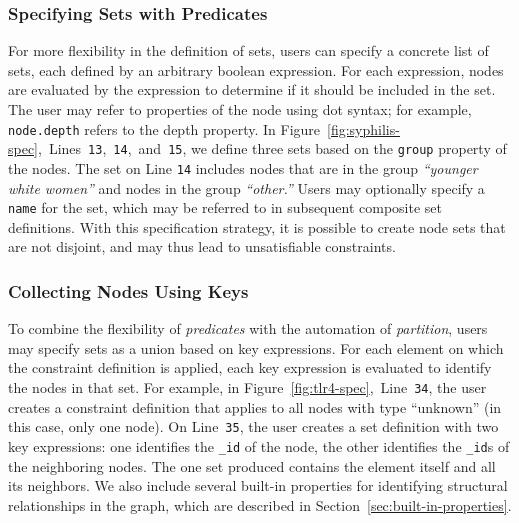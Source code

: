 \subsubsection{Specifying Sets with Predicates}
For more flexibility in the definition of sets, users
can specify a concrete list of sets, each defined by an arbitrary boolean
expression. For each expression, nodes are evaluated by the expression
to determine if it should be included in the set. The user may
refer to properties of the node using dot syntax; for example,
\texttt{node.depth} refers to the depth property. In 
Figure~\ref{fig:syphilis-spec},~Lines~\texttt{13},~\texttt{14},~and~\texttt{15},
we define three sets based on the \texttt{group} property of the nodes.
The set on Line \texttt{14} includes nodes that are in the group 
\emph{``younger white women''} and nodes in the group \emph{``other.''}
Users may optionally specify a \texttt{name} for the set, which may be 
referred to in subsequent composite set definitions. With this specification 
strategy, it is possible to create node sets that are not disjoint, 
and may thus lead to unsatisfiable constraints.

\subsubsection{Collecting Nodes Using Keys}
To combine the flexibility of \emph{predicates} with the automation of 
\emph{partition}, users may specify sets as a union based on key expressions.
For each element on which the constraint definition is applied, each key expression is
evaluated to identify the nodes in that set.
For example, in Figure~\ref{fig:tlr4-spec},~Line~\texttt{34}, the 
user creates a constraint definition that applies to all nodes with type
``unknown'' (in this case, only one node). On Line~\texttt{35}, the user 
creates a set definition with two key expressions: one identifies
the \texttt{\_id} of the node, the other identifies the \texttt{\_id}s of
the neighboring nodes. The one set produced contains the element 
itself and all its neighbors. We also include several 
built-in properties for identifying structural relationships in the 
graph, which are described in Section~\ref{sec:built-in-properties}.

\vspace{10px}
